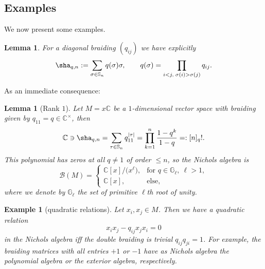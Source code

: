 \documentclass[10pt,a4paper]{amsart}
\numberwithin{equation}{section}
\newtheorem{lem}[teo]{Lemma}
\newtheorem{ese}[teo]{Example}
\newcommand{\C}{\mathbb{C}}
\newcommand{\cB}{\mathcal{B}}
\begin{document}
\subsection{Examples}
We now present some examples.
\begin{lem}\label{lm_braidingfactor}
	For a diagonal braiding $(q_{ij})$ we have explicitly
	\[\sha_{q,n}: =\sum _{\sigma\in \mathbb{S}_n} q(\sigma)\sigma,\qquad
	q(\sigma)=\prod_{i<j,\;\sigma(i)>\sigma(j)} q_{ij}.\]
\end{lem}	

 As an immediate consequence:
\begin{lem}[Rank $1$]\label{lm_truncation}
 Let $M=x\C$ be a $1$-dimensional vector space with braiding given by $q_{11}=q\in\C^\times$, then
 \[\C\ni \sha_{q,n}=\sum_{\tau\in\mathbb{S}_n}q_{11}^{|\tau|}=\prod_{k=1}^n\frac{1-q^k}{1-q}=:[n]_q!.\]
 This polynomial has zeros at all $q\neq 1$ of order $\leq n$, so the Nichols algebra is
 \[\cB(M)=\begin{cases}
		\C[x]/\big(x^\ell\big), & \text{for } q\in\mathbb{G}_\ell, \ \ell>1,\\
		\C[x], & \text{else},
 \end{cases}\]
where we denote by $\mathbb{G}_\ell$ the set of primitive $\ell$th root of unity.
\end{lem}
\begin{ese}[quadratic relations]\label{exm_quadraticRelation}
	Let $x_i,x_j\in M$. Then we have a quadratic relation
	\[x_ix_j-q_{ij}x_jx_i=0\]
in the Nichols algebra iff the double braiding is trivial $q_{ij}q_{ji}=1$.
For example, the braiding matrices with all entries $+1$ or $-1$ have as Nichols algebra the polynomial algebra or the exterior algebra, respectively.
\end{ese}
\end{document}
